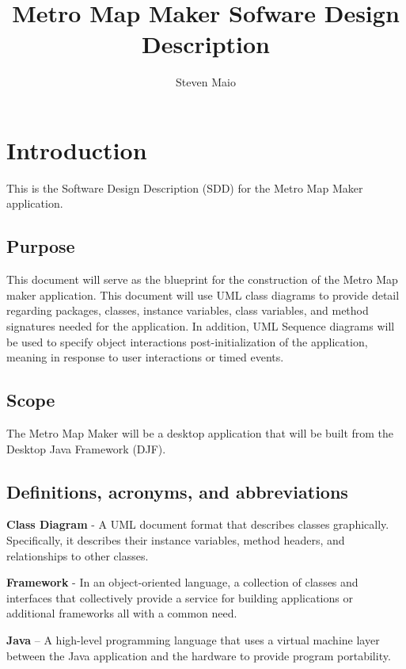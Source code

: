 \documentclass[10pt,a4paper]{article}
\author{Steven Maio}
\title{Metro Map Maker Sofware Design Description}
\begin{document}
\tableofcontents

\newpage

\flushleft

 \section{Introduction}
This is the Software Design Description (SDD) for the Metro Map Maker application.

\subsection{Purpose}
This document will serve as the blueprint for the construction of the Metro Map maker application. This document will use UML class diagrams to provide detail regarding packages, classes, instance variables, class variables, and method signatures needed for the application. In addition, UML Sequence diagrams will be used to specify object interactions post-initialization of the application, meaning in response to user interactions or timed events.

\subsection{Scope}
The Metro Map Maker will be a desktop application that will be built from the Desktop Java Framework (DJF). 

\subsection{Definitions, acronyms, and abbreviations}
\textbf{Class Diagram} - A UML document format that describes classes graphically. Specifically, it describes their instance variables, method headers, and relationships to other classes. \newline

\textbf{Framework} - In an object-oriented language, a collection of classes and interfaces that collectively provide a service for building applications or additional frameworks all with a common need. \newline

\textbf{Java} – A high-level programming language that uses a virtual machine layer between the Java application and the hardware to provide program portability. \newline
\end{document}
